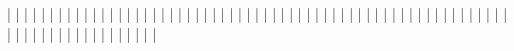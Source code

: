   |                   |
  |                   |
  |                   |
  |                   |
  |                   |
  |                   |
  |                   |
  |                   |
  |                   |
  |                   |
  |                   |
  |                   |
  |                   |
  |                   |
  |                   |
  |                   |
  |                   |
  |                   |
  |                   |
  |                   |
  |                   |
  |                   |
  |                   |
  |                   |
  |                   |
  |                   |
  |                   |
  |                   |
  |                   |
  |                   |
  |                   |
  |                   |
  |                   |
  |                   |
  |                   |
  |                   |
  |                   |
  |                   |
  |